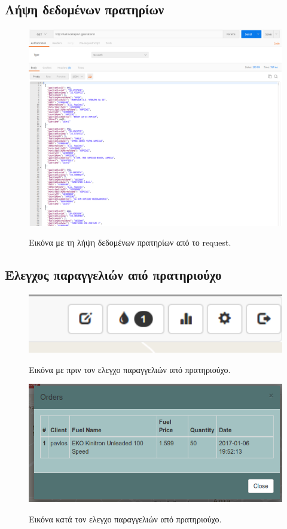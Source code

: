 \subsection{Λήψη δεδομένων πρατηρίων}

\begin{figure}[H]
  \caption{Εικόνα με τη λήψη δεδομένων πρατηρίων από το request.}
  \centering
    \includegraphics[width=1\textwidth]{img/gasstations.png}
    \label{fig:gasstations}
\end{figure}

\subsection{Έλεγχος παραγγελιών από πρατηριούχο}

\begin{figure}[H]
  \caption{Εικόνα με πριν τον ελεγχο παραγγελιών από πρατηριούχο.}
  \centering
    \includegraphics[width=1\textwidth]{img/pre-orders.png}
    \label{fig:pre-orders}
\end{figure}

\begin{figure}[H]
  \caption{Εικόνα κατά τον ελεγχο παραγγελιών από πρατηριούχο.}
  \centering
    \includegraphics[width=1\textwidth]{img/orders.png}
    \label{fig:orders}
\end{figure}


